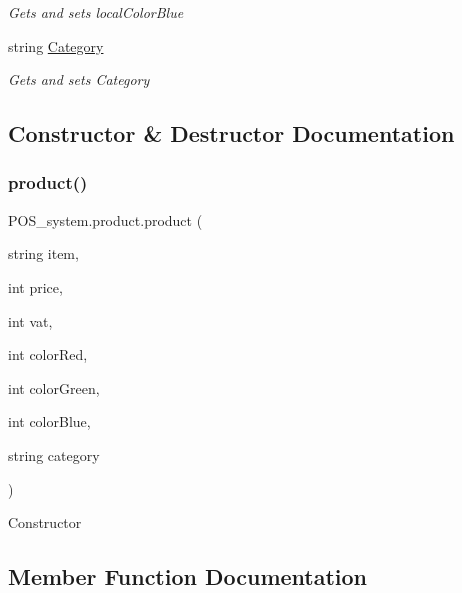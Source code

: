 \begin{DoxyCompactItemize}
\begin{DoxyCompactList}\small\item\em Gets and sets local\+Color\+Blue \end{DoxyCompactList}\item 
string \mbox{\hyperlink{class_p_o_s__system_1_1product_a71632c0b2acb65bfd8f7c5c2b7e97e68}{Category}}
\begin{DoxyCompactList}\small\item\em Gets and sets Category \end{DoxyCompactList}\end{DoxyCompactItemize}


\subsection{Constructor \& Destructor Documentation}
\mbox{\label{class_p_o_s__system_1_1product_ac8d8714ab7ef48ea39fc809cfd7d1dd2}} 
\subsubsection{\texorpdfstring{product()}{product()}}
{\footnotesize\ttfamily P\+O\+S\+\_\+system.\+product.\+product (\begin{DoxyParamCaption}\item[{string}]{item,  }\item[{int}]{price,  }\item[{int}]{vat,  }\item[{int}]{color\+Red,  }\item[{int}]{color\+Green,  }\item[{int}]{color\+Blue,  }\item[{string}]{category }\end{DoxyParamCaption})}



Constructor 



\subsection{Member Function Documentation}
\mbox{\label{class_p_o_s__system_1_1product_a17b6ab9a655cc4ade440d0ed06f08c5b}} 
